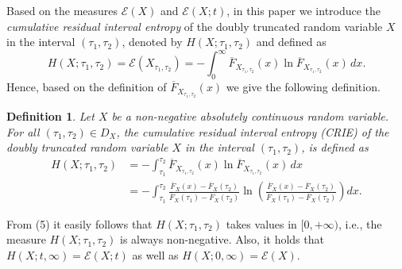 \documentclass[11pt]{article}
\newtheorem{definition}{Definition}
\begin{document}
Based on the measures $\mathcal{E}(X)$ and $\mathcal{E}(X;t)$, in this paper we introduce the \textit{cumulative residual interval entropy} of the doubly truncated random variable $X$ in the interval $(\tau_1, \tau_2)$, denoted by $H(X; \tau_1, \tau_2)$ and defined as
$$ \textstyle H(X; \tau_1, \tau_2) = \mathcal{E}(X_{\tau_1,\tau_2}) = -\int_0^\infty \overline{F}_{X_{\tau_1,\tau_2}}(x) \ln \overline{F}_{X_{\tau_1,\tau_2}}(x) \, dx. $$
Hence, based on the definition of $\overline{F}_{X_{\tau_1,\tau_2}}(x)$ we give the following definition.

 
\begin{definition}
	Let $X$ be a non-negative absolutely continuous random variable. For all $(\tau_1,\tau_2)\in D_X$, the cumulative residual interval entropy (CRIE) of the doubly truncated random variable $X$ in the interval $(\tau_1,\tau_2)$, is defined as
	\begin{align}
		H(X; \tau_1, \tau_2) & = \textstyle -\int_{\tau_1}^{\tau_2} \overline{F}_{X_{\tau_1,\tau_2}}(x) \ln \overline{F}_{X_{\tau_1,\tau_2}}(x) \, dx \nonumber \\
		& = \textstyle-\int_{\tau_1}^{\tau_2} \frac{\overline{F}_X(x) - \overline{F}_X(\tau_2)}{\overline{F}_X(\tau_1) - \overline{F}_X(\tau_2)} \ln \left( \frac{\overline{F}_X(x) - \overline{F}_X(\tau_2)}{\overline{F}_X(\tau_1) - \overline{F}_X(\tau_2)} \right) dx.
	\end{align}
\end{definition}

From (5) it easily follows that $H(X; \tau_1, \tau_2)$ takes values in $[0, +\infty)$, i.e., the measure $H(X; \tau_1, \tau_2)$ is always non-negative. Also, it holds that $H(X; t, \infty) = \mathcal{E}(X; t)$ as well as $H(X; 0, \infty) = \mathcal{E}(X)$.
\end{document}
